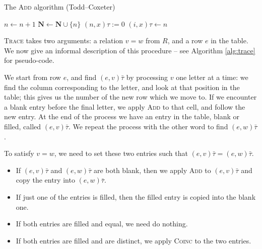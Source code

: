 \begin{algorithm}
\caption{The \textsc{Add} algorithm (Todd--Coxeter)}
\label{alg:add}
\begin{algorithmic}[1]
\State $n \gets n + 1$
\State $\mathbf{N} \gets \mathbf{N} \cup \{n\}$
  \State $(n, x)\tau := 0$
\EndFor
\State $(i, x)\tau \gets n$
\EndProcedure
\end{algorithmic}
\end{algorithm}

\textsc{Trace} takes two arguments: a relation $v=w$ from $R$, and a row $e$
in the table.  We now give an informal description of this procedure -- see
Algorithm \ref{alg:trace} for pseudo-code.

We start from row $e$, and find $(e, v)\bar\tau$ by processing $v$ one letter at a time: we
find the column corresponding to the letter, and look at that position in the
table; this gives us the number of the new row which we move to.  If we
encounter a blank entry before the final letter, we apply \textsc{Add} to that
cell, and follow the new entry.  At the end of the process we have an entry in
the table, blank or filled, called $(e, v)\bar\tau$.  We repeat the
process with the other word to find $(e, w)\bar\tau$.

To satisfy $v=w$, we need to set these two entries such that
$(e, v)\bar\tau = (e, w)\bar\tau$.
\begin{itemize}
\item If $(e, v)\bar\tau$ and $(e, w)\bar\tau$ are both blank, then we apply
  \textsc{Add} to $(e, v)\bar\tau$ and copy the entry into $(e, w)\bar\tau$.
\item If just one of the entries is filled, then the filled entry is copied into
  the blank one.
\item If both entries are filled and equal, we need do nothing.
\item If both entries are filled and are distinct, we apply \textsc{Coinc} to
  the two entries.
\end{itemize}

